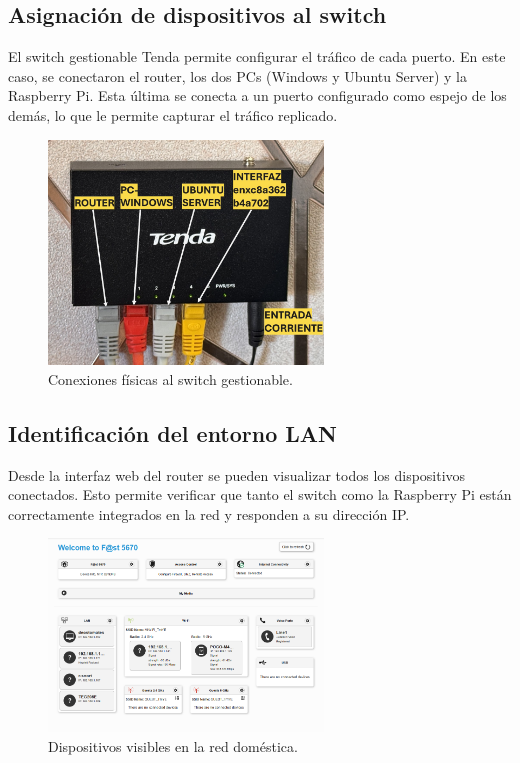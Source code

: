 \documentclass[11pt,a4paper,twoside]{report}
\begin{document}
\subsection*{Asignación de dispositivos al switch}

El switch gestionable Tenda permite configurar el tráfico de cada puerto. En este caso, se conectaron el router, los dos PCs (Windows y Ubuntu Server) y la Raspberry Pi. Esta última se conecta a un puerto configurado como espejo de los demás, lo que le permite capturar el tráfico replicado.

\begin{figure}[H]
	\centering
	\includegraphics[width=0.65\textwidth]{pruebas_config/2-2.JPG}
	\caption{Conexiones físicas al switch gestionable.}
\end{figure}

\subsection*{Identificación del entorno LAN}

Desde la interfaz web del router se pueden visualizar todos los dispositivos conectados. Esto permite verificar que tanto el switch como la Raspberry Pi están correctamente integrados en la red y responden a su dirección IP.

\begin{figure}[H]
	\centering
	\includegraphics[width=0.65\textwidth]{pruebas_config/3-router.png}
	\caption{Dispositivos visibles en la red doméstica.}
\end{figure}
\end{document}
